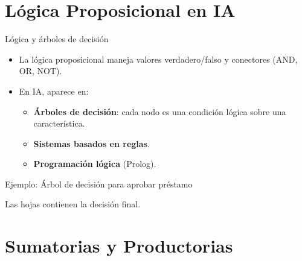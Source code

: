 \documentclass[aspectratio=169, 10pt, xcolor=table]{beamer}
\begin{document}
\section{Lógica Proposicional en IA}

\begin{frame}{Lógica y árboles de decisión}
    \begin{itemize}
        \item La lógica proposicional maneja valores verdadero/falso y conectores (AND, OR, NOT).
        \item En IA, aparece en:
        \begin{itemize}
            \item \textbf{Árboles de decisión}: cada nodo es una condición lógica sobre una característica.
            \item \textbf{Sistemas basados en reglas}.
            \item \textbf{Programación lógica} (Prolog).
        \end{itemize}
    \end{itemize}
\end{frame}

\begin{frame}{Ejemplo: Árbol de decisión para aprobar préstamo}
    \begin{center}
    \end{center}
    Las hojas contienen la decisión final.
\end{frame}

\section{Sumatorias y Productorias}
\end{document}
